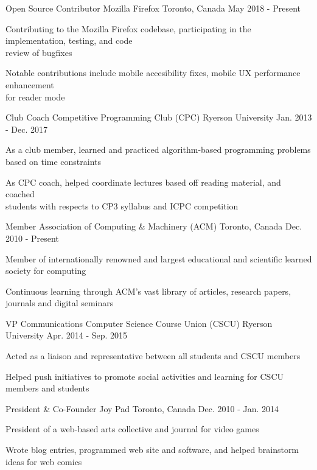 \begin{cventries}
    \cventry
    {Open Source Contributor}
    {Mozilla Firefox}
    {Toronto, Canada}
    {May 2018 - Present}
    {
      \begin{cvitems}
        \item {Contributing to the Mozilla Firefox codebase, participating in the implementation, testing, and code \\review of bugfixes}
        \item {Notable contributions include mobile accesibility fixes, mobile UX performance enhancement \\for reader mode}
      \end{cvitems}
    }
   \cventry
    {Club Coach}
    {Competitive Programming Club (CPC)}
    {Ryerson University}
    {Jan. 2013 - Dec. 2017}
    {
      \begin{cvitems}
        \item {As a club member, learned and practiced algorithm-based programming problems based on time constraints}
        \item {As CPC coach, helped coordinate lectures based off reading material, and coached \\students with respects to CP3 syllabus and ICPC competition}
      \end{cvitems}
    }
   \cventry
    {Member}
    {Association of Computing \& Machinery (ACM)}
    {Toronto, Canada}
    {Dec. 2010 - Present}
    {
      \begin{cvitems}
        \item {Member of internationally renowned and largest educational and scientific learned society for computing}
        \item {Continuous learning through ACM's vast library of articles, research papers, journals and digital seminars}
      \end{cvitems}
    }
  \cventry
    {VP Communications}
    {Computer Science Course Union (CSCU)}
    {Ryerson University}
    {Apr. 2014 - Sep. 2015}
    {
      \begin{cvitems}
        \item {Acted as a liaison and representative between all students and CSCU members}
        \item {Helped push initiatives to promote social activities and learning for CSCU members and students}
      \end{cvitems}
      }
  \cventry		
  	{President \& Co-Founder}		
  	{Joy Pad}		
  	{Toronto, Canada}		
  	{Dec. 2010 - Jan. 2014}		
  	{		
    	\begin{cvitems}		
      	\item {President of a web-based arts collective and journal for video games}		
      	\item {Wrote blog entries, programmed web site and software, and helped brainstorm ideas for web comics}		
    \end{cvitems}		
   }
\end{cventries}